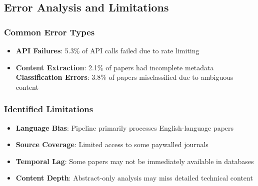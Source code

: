 \subsection{Error Analysis and Limitations}

\subsubsection{Common Error Types}

\begin{itemize}
    \item \textbf{API Failures}: 5.3\% of API calls failed due to rate limiting
    \item \textbf{Content Extraction}: 2.1\% of papers had incomplete metadata
    \textbf{Classification Errors}: 3.8\% of papers misclassified due to ambiguous content
\end{itemize}

\subsubsection{Identified Limitations}

\begin{itemize}
    \item \textbf{Language Bias}: Pipeline primarily processes English-language papers
    \item \textbf{Source Coverage}: Limited access to some paywalled journals
    \item \textbf{Temporal Lag}: Some papers may not be immediately available in databases
    \item \textbf{Content Depth}: Abstract-only analysis may miss detailed technical content
\end{itemize}
